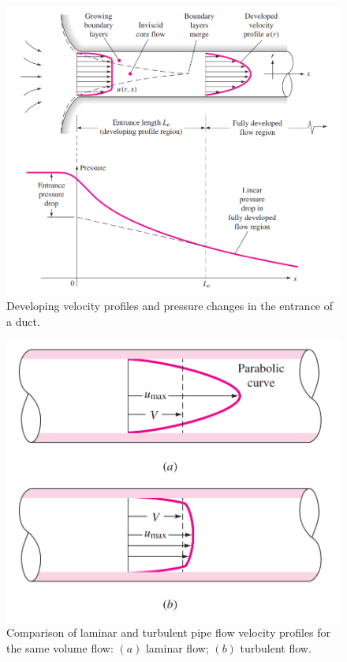 \documentclass[9pt]{article} %
\numberwithin{equation}{section} %
\begin{document}
\begin{multicols}{2}
\begin{figure}[!htb] %
\centering
\includegraphics[scale=0.46]{developing_velocity_profile}
\caption{Developing velocity profiles and pressure changes in the entrance of a duct.}
\label{fig:developing-velocity-profile}
\end{figure}
\begin{figure}[!htb]
\centering
\includegraphics[scale=0.35]{comparing_velocity_profiles}
\caption{Comparison of laminar and turbulent pipe flow velocity profiles for the same volume flow: $(a)$ laminar flow; $(b)$ turbulent flow.}
\label{fig:comparing-velocity-profiles}
\end{figure}


\end{multicols}
\end{document}
